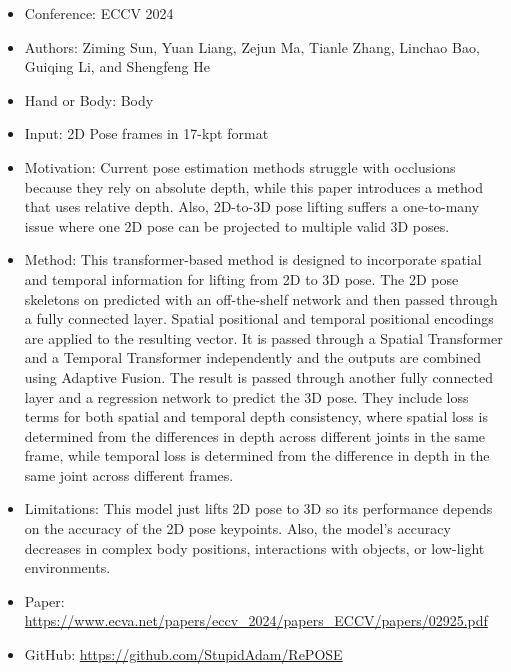 \documentclass{article}
\begin{document}
\begin{itemize}
    \item Conference: ECCV 2024
    \item Authors: Ziming Sun, Yuan Liang, Zejun Ma, Tianle Zhang, Linchao Bao, Guiqing Li, and Shengfeng He
    \item Hand or Body: Body
    \item Input: 2D Pose frames in 17-kpt format
    \item Motivation: Current pose estimation methods struggle with occlusions because they rely on absolute depth, while this paper introduces a method that uses relative depth. Also, 2D-to-3D pose lifting suffers a one-to-many issue where one 2D pose can be projected to multiple valid 3D poses.
    \item Method: This transformer-based method is designed to incorporate spatial and temporal information for lifting from 2D to 3D pose. The 2D pose skeletons on predicted with an off-the-shelf network and then passed through a fully connected layer. Spatial positional and temporal positional encodings are applied to the resulting vector. It is passed through a Spatial Transformer and a Temporal Transformer independently and the outputs are combined using Adaptive Fusion. The result is passed through another fully connected layer and a regression network to predict the 3D pose. They include loss terms for both spatial and temporal depth consistency, where spatial loss is determined from the differences in depth across different joints in the same frame, while temporal loss is determined from the difference in depth in the same joint across different frames.
    \item Limitations: This model just lifts 2D pose to 3D so its performance depends on the accuracy of the 2D pose keypoints. Also, the model's accuracy decreases in complex body positions, interactions with objects, or low-light environments.
    \item Paper: \url{https://www.ecva.net/papers/eccv_2024/papers_ECCV/papers/02925.pdf}
    \item GitHub: \url{https://github.com/StupidAdam/RePOSE}
\end{itemize}
\end{document}
